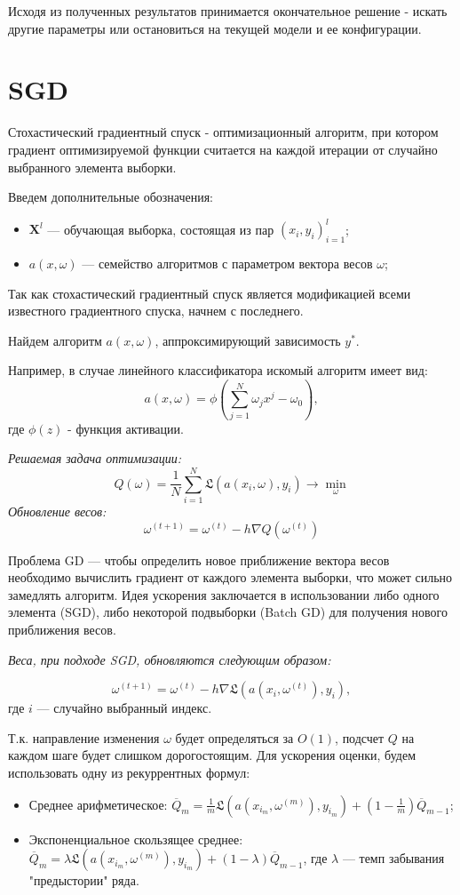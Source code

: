 \documentclass[11pt, oneside]{article}   	%
\begin{document}
Исходя из полученных результатов принимается окончательное решение - искать другие параметры или остановиться на текущей модели и ее конфигурации.

\section{SGD}
Стохастический градиентный спуск - оптимизационный алгоритм, при котором градиент оптимизируемой функции считается на каждой итерации от случайно выбранного элемента выборки.

Введем дополнительные обозначения:
\begin{itemize}
	\item $ \bm{X}^l $ --- обучающая выборка, состоящая из пар $ (x_i, y_i)_{i=1}^l $;
	\item $ a(x, \omega) $ --- семейство алгоритмов с параметром вектора весов $ \omega $;
\end{itemize}


Так как стохастический градиентный спуск является модификацией всеми известного градиентного спуска, начнем с последнего.

Найдем алгоритм $ a(x, \omega) $, аппроксимирующий зависимость $ y^* $.

Например, в случае линейного классификатора искомый алгоритм имеет вид:
$$ a(x, \omega) = \phi(\sum\limits_{j=1}^N \omega_jx^j - \omega_0), $$где $ \phi(z) $ - функция активации. 

\textit{Решаемая задача оптимизации:}
$$ Q(\omega) = \frac{1}{N}\sum\limits_{i=1}^{N}\mathfrak{L}(a(x_i, \omega), y_i)\rightarrow\min\limits_{\omega} $$
\textit{Обновление весов:}
$$ \omega^{(t+1)} = \omega^{(t)} - h\nabla Q(\omega^{(t)}) $$

Проблема GD --- чтобы определить новое приближение вектора весов необходимо вычислить градиент от каждого элемента выборки, что может сильно замедлять алгоритм.
Идея ускорения заключается в использовании либо одного элемента (SGD), либо некоторой подвыборки (Batch GD) для получения нового приближения весов. 

\textit{Веса, при подходе SGD, обновляются следующим образом:}

$$ \omega^{(t+1)} = \omega^{(t)} - h\nabla\mathfrak{L}(a(x_i, \omega^{(t)}), y_i),$$ где $ i $ --- случайно выбранный индекс.

Т.к. направление изменения $ \omega $ будет определяться за $ O(1) $, подсчет $ Q $ на каждом шаге будет слишком дорогостоящим. Для ускорения оценки, будем использовать одну из рекуррентных формул:
\begin{itemize}
	\item Среднее арифметическое: $ \overline Q_m = \frac{1}{m}\mathfrak{L}(a(x_{i_m}, \omega^{(m)}), y_{i_m}) + (1 - \frac{1}{m}) \overline Q_{m-1}$;
	\item Экспоненциальное скользящее среднее: $ \overline Q_m = \lambda\mathfrak{L}(a(x_{i_m}, \omega^{(m)}), y_{i_m}) + (1 - \lambda) \overline Q_{m-1}$, где $ \lambda $ --- темп забывания "предыстории" ряда.
\end{itemize}
\end{document}
